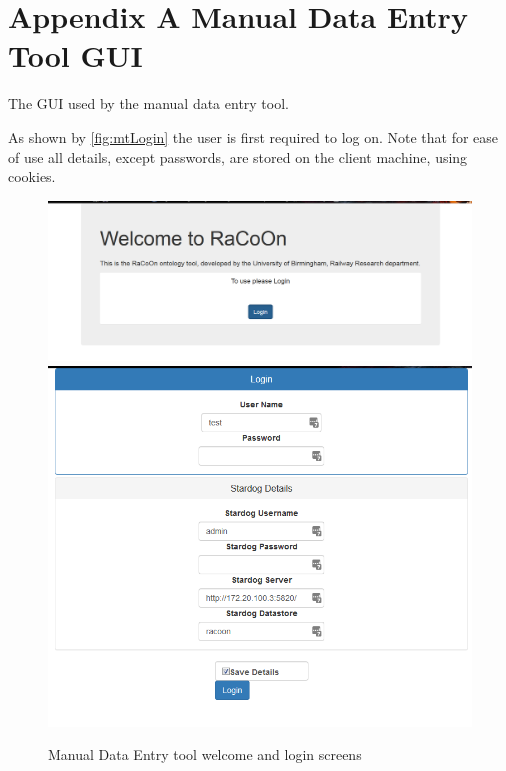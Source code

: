 
\chapter{Appendix A Manual Data Entry Tool GUI}
\label{app:mantoolgui}

The GUI used by the manual data entry tool.

As shown by \autoref{fig:mtLogin} the user is first required to log on. Note that for ease of use all details, except passwords, are stored on the client machine, using cookies.
 \begin{figure}[H]
\includegraphics[max height=\textheight,max width=\linewidth]{gfx/manToolWelcome}
\includegraphics[max height=0.5\textheight,max width=\linewidth]{gfx/manToolLogin}
\caption{Manual Data Entry tool welcome and login screens}
\label{fig:mtLogin}
\end{figure}

